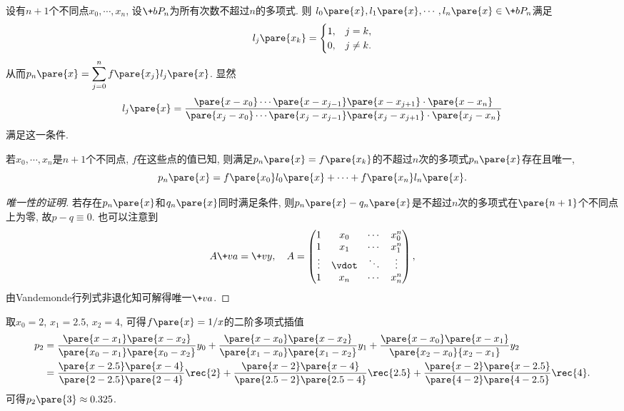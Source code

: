 \documentclass[hidelinks]{ctexart}
\begin{document}
设有$n+1$个不同点$x_0,\cdots,x_n$, 设$\+bP_n$为所有次数不超过$n$的多项式. 则 $l_0\pare{x}, l_1\pare{x},\cdots,l_n\pare{x}\in \+bP_n$满足
\[ l_j\pare{x_k} = \begin{cases}
    1,  & j = k, \\
    0,  & j \neq k.
\end{cases} \]
从而$\displaystyle p_n\pare{x} = \sum_{j=0}^n f\pare{x_j}l_j\pare{x}$. 显然
\[ l_j\pare{x} = \frac{\pare{x-x_0}\cdots\pare{x-x_{j-1}}\pare{x-x_{j+1}}\cdot \pare{x-x_n}}{\pare{x_j-x_0}\cdots\pare{x_j-x_{j-1}}\pare{x_j-x_{j+1}}\cdot \pare{x_j-x_n}} \]
满足这一条件.
\begin{theorem}
    若$x_0,\cdots,x_n$是$n+1$个不同点, $f$在这些点的值已知, 则满足$p_n\pare{x} = f\pare{x_k}$的不超过$n$次的多项式$p_n\pare{x}$存在且唯一,
    \[ p_n\pare{x} = f\pare{x_0}l_0\pare{x} + \cdots + f\pare{x_n}l_n\pare{x}. \]
\end{theorem}
\begin{proof}[唯一性的证明]
    若存在$p_n\pare{x}$和$q_n\pare{x}$同时满足条件, 则$p_n\pare{x} - q_n\pare{x}$是不超过$n$次的多项式在$\pare{n+1}$个不同点上为零, 故$p-q\equiv 0$. 也可以注意到
    \[ A\+va = \+vy,\quad A = \begin{pmatrix}
        1 & x_0 & \cdots & x_0^n \\
        1 & x_1 & \cdots & x_1^n \\
        \vdots & \vdot & \ddots & \vdots \\
        1 & x_n & \cdots & x_n^n
    \end{pmatrix}, \]
    由Vandemonde行列式非退化知可解得唯一$\+va$.
\end{proof}
\begin{sample}
    \begin{ex}
        取$x_0 = 2$, $x_1 = 2.5$, $x_2 = 4$, 可得$f\pare{x} = 1/x$的二阶多项式插值
        \begin{align*}
            p_2 &= \frac{\pare{x-x_1}\pare{x-x_2}}{\pare{x_0-x_1}\pare{x_0-x_2}}y_0 + \frac{\pare{x-x_0}\pare{x-x_2}}{\pare{x_1-x_0}\pare{x_1-x_2}}y_1 + \frac{\pare{x-x_0}\pare{x-x_1}}{\pare{x_2-x_0}{x_2-x_1}}y_2 \\
            &= \frac{\pare{x-2.5}\pare{x-4}}{\pare{2-2.5}\pare{2-4}}\rec{2} + \frac{\pare{x-2}\pare{x-4}}{\pare{2.5-2}\pare{2.5-4}}\rec{2.5} + \frac{\pare{x-2}\pare{x-2.5}}{\pare{4-2}\pare{4-2.5}}\rec{4}.
        \end{align*}
        可得$p_2\pare{3} \approx 0.325$.
    \end{ex}
\end{sample}
\end{document}
